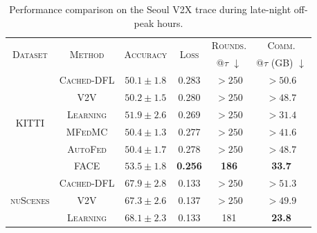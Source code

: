 \begin{table}[t]
    \centering
\caption{Performance comparison on the Seoul V2X trace during late-night off-peak hours.}
    \label{tab:seoul_night}
    \footnotesize
    \renewcommand{\arraystretch}{1.0}
    \setlength{\tabcolsep}{3pt}
    \begin{tabular}{c|c|c|c|c|c}
        \toprule
        \multirow{2}{*}{\textsc{Dataset}}
        & \multirow{2}{*}{\textsc{Method}}
        & \multirow{2}{*}{\textsc{Accuracy}}
        & \multirow{2}{*}{\textsc{Loss}}
        & \textsc{Rounds.}
        & \textsc{Comm.} \\

        &
        &
        &
        & @$\tau$ $\downarrow$
        & @$\tau$ (GB) $\downarrow$ \\
        \midrule

        \multirow{6}{*}{\textsc{KITTI}}
        & \textsc{Cached-DFL}
        & $50.1 \pm 1.8$
        & 0.283
        & $>250$
        & $>50.6$ \\

        & \textsc{V2V}
        & $50.2 \pm 1.5$
        & 0.280
        & $>250$
        & $>48.7$ \\

        & \textsc{Learning}
        & $51.9 \pm 2.6$
        & 0.269
        & $>250$
        & $>31.4$ \\[1pt]

        & \textsc{MFedMC}
        & $50.4 \pm 1.3$
        & 0.277
        & $>250$
        & $>41.6$ \\

        & \textsc{AutoFed}
        & $50.4 \pm 1.7$
        & 0.278
        & $>250$
        & $>48.7$ \\[1pt]

        & \textsc{FACE}
        & $\mathbf{53.5 \pm 1.8}$
        & \textbf{0.256}
        & \textbf{186}
        & \textbf{33.7} \\

        \midrule

        \multirow{6}{*}{\textsc{nuScenes}}
        & \textsc{Cached-DFL}
        & $67.9 \pm 2.8$
        & 0.133
        & $>250$
        & $>51.3$ \\

        & \textsc{V2V}
        & $67.3 \pm 2.6$
        & 0.137
        & $>250$
        & $>49.9$ \\

        & \textsc{Learning}
        & $68.1 \pm 2.3$
        & 0.133
        & 181
        & \textbf{23.8} \\[1pt]


\end{tabular}
\end{table}

